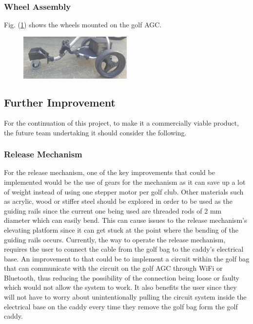 \documentclass[11pt,landscape]{article}
\begin{document}
\begin{multicols}{2}
\newpage
\subsubsection{Wheel Assembly}
Fig. (\ref{fig:sprayed}) shows the wheels mounted on the golf AGC. 

\begin{figure}[H]
    \begin{center}
        \includegraphics[width=0.5\textwidth]{Figure29.jpg}
        \label{fig:sprayed}
    \end{center}
\end{figure}


\subsection{Further Improvement}

For the continuation of this project, to make it a commercially viable
product, the future team undertaking it should consider the following.

\subsubsection{Release Mechanism}
For the release mechanism, one of the key improvements that could be
implemented would be the use of gears for the mechanism as it can save up a
lot of weight instead of using one stepper motor per golf club. Other
materials such as acrylic, wood or stiffer steel should be explored in order
to be used as the guiding rails since the current one being used are
threaded rods of 2 mm diameter which can easily bend. This can cause issues
to the release mechanism’s elevating platform since it can get stuck at the
point where the bending of the guiding rails occurs. Currently, the way to
operate the release mechanism, requires the user to connect the cable from
the golf bag to the caddy’s electrical base. An improvement to that could be
to implement a circuit within the golf bag that can communicate with the
circuit on the golf AGC through WiFi or Bluetooth, thus reducing the
possibility of the connection being loose or faulty which would not allow the system
to work. It also benefits the user since they will not have to worry about
unintentionally pulling the circuit system inside the electrical base on the
caddy every time they remove the golf bag form the golf caddy. 


\end{multicols}
\end{document}
